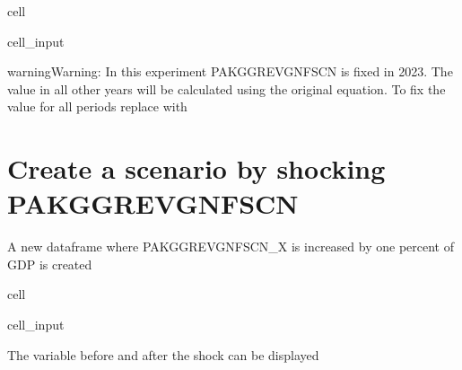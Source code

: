 \documentclass[letterpaper,10pt,english]{jupyterBook}
\begin{document}
\begin{sphinxuseclass}{cell}\begin{sphinxVerbatimInput}

\begin{sphinxuseclass}{cell_input}
\begin{sphinxVerbatim}[commandchars=\\\{\}]
  
\end{sphinxVerbatim}

\end{sphinxuseclass}\end{sphinxVerbatimInput}

\end{sphinxuseclass}
\begin{sphinxadmonition}{warning}{Warning:}
\sphinxAtStartPar
In this experiment PAKGGREVGNFSCN is fixed in 2023. The value in all other years will be calculated using the original equation. 
To fix the value for all periods replace  with 
\end{sphinxadmonition}


\section{Create a scenario by shocking PAKGGREVGNFSCN}
\label{\detokenize{content/howto/experiments/Standard experiment simple:create-a-scenario-by-shocking-pakggrevgnfscn}}
\sphinxAtStartPar
A new dataframe where PAKGGREVGNFSCN\_X is increased by one percent of GDP is created

\begin{sphinxuseclass}{cell}\begin{sphinxVerbatimInput}

\begin{sphinxuseclass}{cell_input}
\begin{sphinxVerbatim}[commandchars=\\\{\}]
  \PYG{p}{[}\PYG{p}{]} 
\end{sphinxVerbatim}

\end{sphinxuseclass}\end{sphinxVerbatimInput}

\end{sphinxuseclass}
\sphinxAtStartPar
The variable before and after the shock can be
displayed
\end{document}
